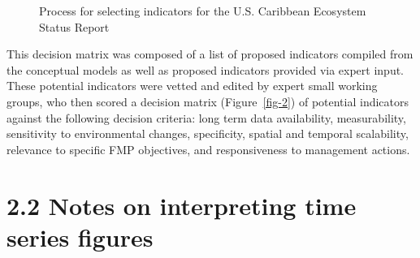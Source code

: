 \documentclass[
  letterpaper,
  oneside,
  open=any]{scrbook}
\begin{document}
\begin{figure}


\caption{\label{fig-1}Process for selecting indicators for the U.S.
Caribbean Ecosystem Status Report}

\end{figure}%

This decision matrix was composed of a list of proposed indicators
compiled from the conceptual models as well as proposed indicators
provided via expert input. These potential indicators were vetted and
edited by expert small working groups, who then scored a decision matrix
(Figure~\ref{fig-2}) of potential indicators against the following
decision criteria: long term data availability, measurability,
sensitivity to environmental changes, specificity, spatial and temporal
scalability, relevance to specific FMP objectives, and responsiveness to
management actions.

\section{2.2 Notes on interpreting time series
figures}\label{notes-on-interpreting-time-series-figures}
\end{document}
